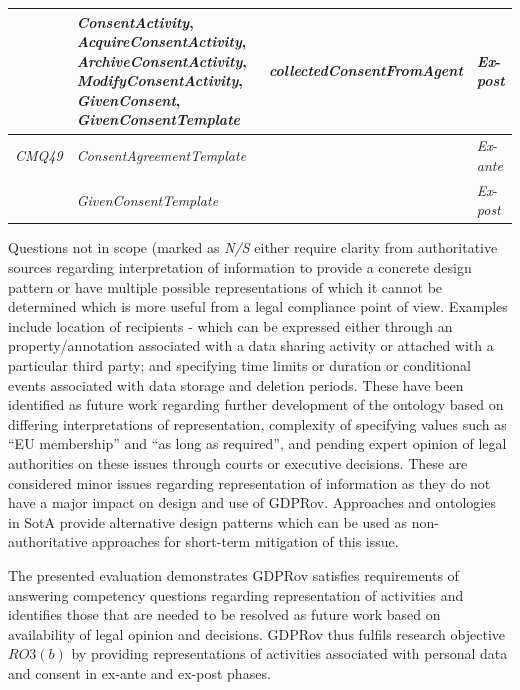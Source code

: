 \begin{table}[htbp]
\begin{tabularx}{\linewidth}{|l|X|p{5cm}|l|}
 & \textit{ConsentActivity}, \textit{AcquireConsentActivity}, \textit{ArchiveConsentActivity}, \textit{ModifyConsentActivity}, \textit{GivenConsent}, \textit{GivenConsentTemplate} & \textit{collectedConsentFromAgent} & \textit{Ex}-\textit{post} \\ \hline
\textit{CMQ49} & \textit{ConsentAgreementTemplate} &  & \textit{Ex}-\textit{ante} \\ \hline
 & \textit{GivenConsentTemplate} &  & \textit{Ex}-\textit{post} \\ \hline
\end{tabularx}
\end{table}

Questions not in scope (marked as \textit{N/S} either require clarity from authoritative sources regarding interpretation of information to provide a concrete design pattern or have multiple possible representations of which it cannot be determined which is more useful from a legal compliance point of view. Examples include location of recipients - which can be expressed either through an property/annotation associated with a data sharing activity or attached with a particular third party; and specifying time limits or duration or conditional events associated with data storage and deletion periods. These have been identified as future work regarding further development of the ontology based on differing interpretations of representation, complexity of specifying values such as ``EU membership'' and  ``as long as required'', and pending expert opinion of legal authorities on these issues through courts or executive decisions.
These are considered minor issues regarding representation of information as they do not have a major impact on design and use of GDPRov.
Approaches and ontologies in SotA provide alternative design patterns which can be used as non-authoritative approaches for short-term mitigation of this issue.

The presented evaluation demonstrates GDPRov satisfies requirements of answering competency questions regarding representation of activities and identifies those that are needed to be resolved as future work based on availability of legal opinion and decisions. GDPRov thus fulfils research objective $RO3(b)$ by providing representations of activities associated with personal data and consent in ex-ante and ex-post phases.

